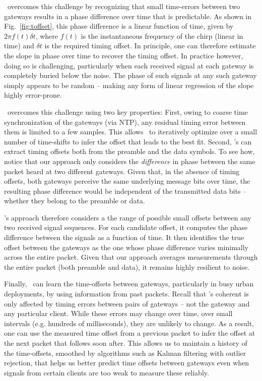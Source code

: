  \name\ overcomes this challenge by recognizing that small time-errors between two gateways results in a phase difference over time that is predictable. As shown in Fig.~\ref{fig:toffset}, this phase difference is a linear function of time, given by $2\pi f(t) \delta t$, where $f(t)$ is the instantaneous frequency of the chirp (linear in time) and $\delta t$ is the required timing offset. In principle, one can therefore estimate the slope in phase over time to recover the timing offset. In practice however, doing so is challenging, particularly when each received signal at each gateway is completely buried below the noise. The phase of such signals at any such gateway simply appears to be random -- making any form of linear regression of the slope highly error-prone.

\name\ overcomes this challenge using two key properties: First, owing to coarse time synchronization of the gateways (via NTP), any residual timing error between them is limited to a few samples. This allows \name\ to iteratively optimize over a small number of time-shifts to infer the offset that leads to the best fit. Second, \name's can extract timing offsets both from the preamble and the data symbols. To see how, notice that our approach only considers the {\it difference} in phase between the same packet heard at two different gateways. Given that, in the absence of timing offsets, both gateways perceive the same underlying message bits over time, the resulting phase difference would be independent of the transmitted data bits -- whether they belong to the preamble or data. 

\name's approach therefore considers a the range of possible small offsets between any two received signal sequences. For each candidate offset, it computes the phase difference between the signals as a function of time. It then identifies the true offset between the gateways as the one whose phase difference varies minimally across the entire packet. Given that our approach averages measurements through the entire packet (both preamble and data), it remains highly resilient to noise.\vspace*{0.1in}


 Finally, \name\ can learn the time-offsets between gateways, particularly in busy urban deployments, by using information from past packets. Recall that \name's coherent is only affected by timing errors between pairs of gateways -- not the gateway and any particular client. While these errors may change over time, over small intervals (e.g. hundreds of milliseconds), they are unlikely to change. As a result, one can use the measured time offset from a previous packet to infer the offset at the next packet that follows soon after. This allows us to maintain a history of the time-offsets, smoothed by algorithms such as Kalman filtering with outlier rejection, that helps us better predict time offsets between gateways even when signals from certain clients are too weak to measure these reliably. 



